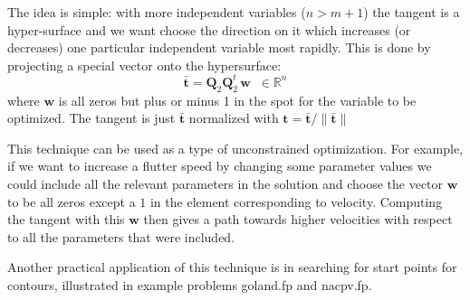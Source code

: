 \documentclass[11pt,openany,twoside]{book}
\numberwithin{equation}{section}		%
\newcommand{\Matrix}[1]{\boldsymbol{#1}}
\newcommand{\Vector}[1]{\boldsymbol{#1}}
\newcommand{\Eqn}[1]{Eq.\ \ref{#1}}  %
\begin{document}
The idea is simple: with more independent variables ($n > m+1$)
the tangent is a hyper-surface and we want choose the direction on it
which increases (or decreases) one particular independent variable most
rapidly. This is done by projecting a special vector onto the hypersurface:
\begin{equation} \label{eqn:project}
\bar{\Vector{t}} = \Matrix{Q}_2\Matrix{Q}_2^t\,\Vector{w} \;\; \in \mathbb{R}^n
\end{equation}
where $\Vector{w}$ is all zeros but plus or minus 1 in the spot for
the variable to be optimized.
The tangent is just $\bar{\Vector{t}}$ normalized with
$\Vector{t} = \bar{\Vector{t}}/\|\bar{\Vector{t}}\|$



This technique can be used as a type of unconstrained optimization.
For example, if we want to increase a flutter speed by changing some parameter values
we could include all the relevant parameters in the solution and choose
the vector $\Vector{w}$ to be all zeros except a $1$ in the element
corresponding to velocity. Computing the tangent with this $\Vector{w}$
then gives a path towards higher velocities with respect to all the
parameters that were included.

Another practical application of this technique is in searching for
start points for contours, illustrated in example problems 
goland.fp and nacpv.fp.
\par
\par
\end{document}
